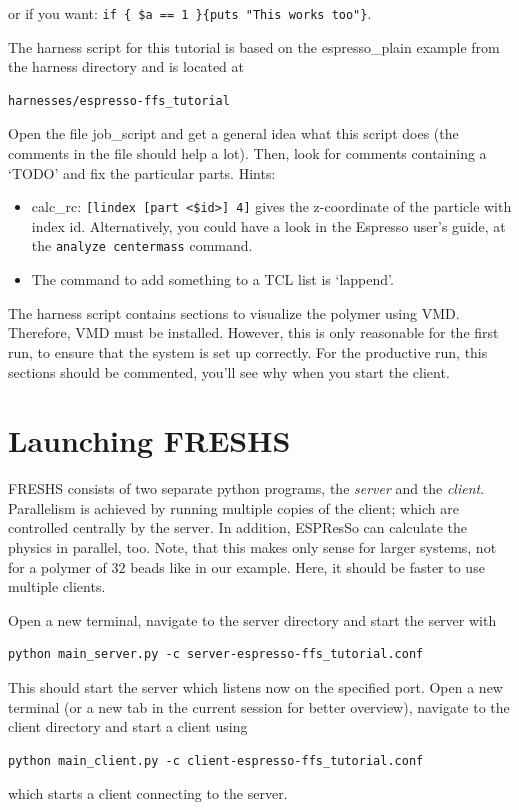 \documentclass[a4paper,oneside]{article}
\newenvironment{mylisting}
{\begin{list}{}{\setlength{\leftmargin}{1em}}\item\scriptsize\bfseries}
{\end{list}}
\begin{document}
or if you want: \verb+if { $a == 1 }{puts "This works too"}+.




The harness script for this tutorial is based on the espresso\_plain example from the harness directory and is located at
\begin{mylisting}
\begin{verbatim}
harnesses/espresso-ffs_tutorial
\end{verbatim}
\end{mylisting}
Open the file job\_script and get a general idea what this script does (the comments in the file should help a lot). Then, look for comments containing a `TODO' and fix the particular parts. Hints:
\begin{itemize}
 \item calc\_rc: \verb+[lindex [part <$id>] 4]+
gives the z-coordinate of the particle with index id. Alternatively, you could have a look in the Espresso user's guide, at the \verb+analyze centermass+ command.
 \item The command to add something to a TCL list is `lappend'.
\end{itemize}
The harness script contains sections to visualize the polymer using VMD. Therefore, VMD must be installed. However, this is only reasonable for the first run, to ensure that the system is set up correctly. For the productive run, this sections should be commented, you'll see why when you start the client.


\section{Launching FRESHS}

FRESHS consists of two separate python programs, the {\it server} and the {\it client}.  Parallelism is achieved by running multiple copies of the client; which are controlled centrally by the server. In addition, ESPResSo can calculate the physics in parallel, too. Note, that this makes only sense for larger systems, not for a polymer of $32$ beads like in our example. Here, it should be faster to use multiple clients.

Open a new terminal, navigate to the server directory and start the server with
\begin{mylisting}
\begin{verbatim}
python main_server.py -c server-espresso-ffs_tutorial.conf
\end{verbatim}
\end{mylisting}
This should start the server which listens now on the specified port. Open a new terminal (or a new tab in the current session for better overview), navigate to the client directory and start a client using
\begin{mylisting}
\begin{verbatim}
python main_client.py -c client-espresso-ffs_tutorial.conf
\end{verbatim}
\end{mylisting}
which starts a client connecting to the server.
\end{document}
